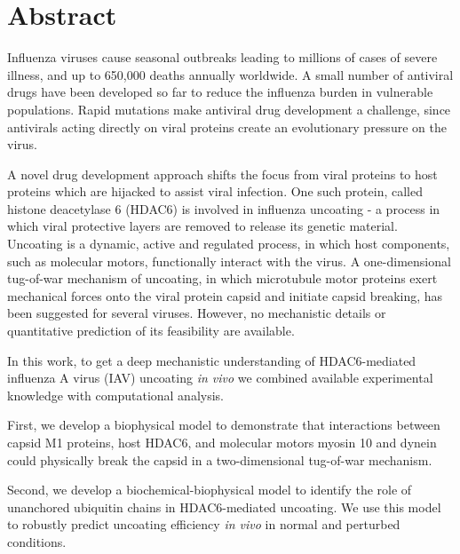 \begingroup
\let\clearpage\relax
\let\cleardoublepage\relax
\let\cleardoublepage\relax

\chapter*{Abstract}

Influenza viruses cause seasonal outbreaks leading to millions of cases of severe illness, and up to 650,000 deaths annually worldwide. A small number of antiviral drugs have been developed so far to reduce the influenza burden in vulnerable populations. Rapid mutations make antiviral drug development a challenge, since antivirals acting directly on viral proteins create an evolutionary pressure on the virus.

A novel drug development approach shifts the focus from viral proteins to host proteins which are hijacked to assist viral infection. One such protein, called histone deacetylase 6 (HDAC6) is involved in influenza uncoating - a process in which viral protective layers are removed to release its genetic material. Uncoating is a dynamic, active and regulated process, in which host components, such as molecular motors, functionally interact with the virus. A one-dimensional tug-of-war mechanism of uncoating, in which microtubule motor proteins exert mechanical forces onto the viral protein capsid and initiate capsid breaking, has been suggested for several viruses. However, no mechanistic details or quantitative prediction of its feasibility are available.

In this work, to get a deep mechanistic understanding of HDAC6-mediated influenza A virus (IAV) uncoating \textit{in vivo} we combined available experimental knowledge with computational analysis.

First, we develop a biophysical model to demonstrate that interactions between capsid M1 proteins, host HDAC6, and molecular motors myosin 10 and dynein could physically break the capsid in a two-dimensional tug-of-war mechanism.

Second, we develop a biochemical-biophysical model to identify the role of unanchored ubiquitin chains in HDAC6-mediated uncoating. We use this model to robustly predict uncoating efficiency \textit{in vivo} in normal and perturbed conditions.

